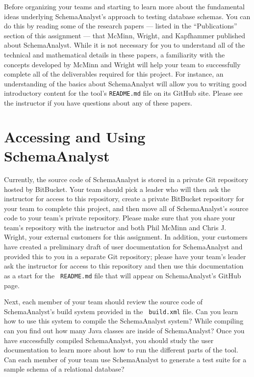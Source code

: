 Before organizing your teams and starting to learn more about the fundamental ideas underlying SchemaAnalyst's approach
to testing database schemas. You can do this by reading some of the research papers --- listed in the ``Publications''
section of this assignment --- that McMinn, Wright, and Kapfhammer published about SchemaAnalyst. While it is not
necessary for you to understand all of the technical and mathematical details in these papers, a familiarity with the
concepts developed by McMinn and Wright will help your team to successfully complete all of the deliverables required
for this project. For instance, an understanding of the basics about SchemaAnalyst will allow you to writing good
introductory content for the tool's {\tt README.md} file on its GitHub site. Please see the instructor if you have
questions about any of these papers.

\vspace*{-.05in}
\section*{Accessing and Using SchemaAnalyst}

Currently, the source code of SchemaAnalyst is stored in a private Git repository hosted by BitBucket. Your team should
pick a leader who will then ask the instructor for access to this repository, create a private BitBucket repository for
your team to complete this project, and then move all of SchemaAnalyst's source code to your team's private repository.
Please make sure that you share your team's repository with the instructor and both Phil McMinn and Chris J.
Wright, your external customers for this assignment. In addition, your customers have created a preliminary draft of
user documentation for SchemaAnalyst and provided this to you in a separate Git repository; please have your team's
leader ask the instructor for access to this repository and then use this documentation as a start for the {\tt
README.md} file that will appear on SchemaAnalyst's GitHub page.

Next, each member of your team should review the source code of SchemaAnalyst's build system provided in the {\tt
build.xml} file. Can you learn how to use this system to compile the SchemaAnalyst system? While compiling can you find
out how many Java classes are inside of SchemaAnalyst? Once you have successfully compiled SchemaAnalyst, you should
study the user documentation to learn more about how to run the different parts of the tool. Can each member of your
team use SchemaAnalyst to generate a test suite for a sample schema of a relational database?

